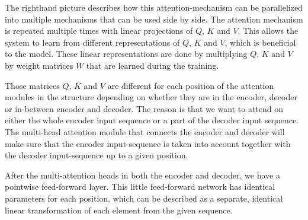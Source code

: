 The righthand picture describes how this attention-mechanism can be parallelized
into multiple mechanisms that can be used side by side. The attention mechanism
is repeated multiple times with linear projections of $Q$, $K$ and $V$. This
allows the system to learn from different representations of $Q$, $K$ and $V$,
which is beneficial to the model. These linear representations are done by multiplying
$Q$, $K$ and $V$ by weight matrices $W$ that are learned during the training.
\newline

Those matrices $Q$, $K$ and $V$ are different for each position of the attention
modules in the structure depending on whether they are in the encoder, decoder
or in-between encoder and decoder. The reason is that we want to attend on either
the whole encoder input sequence or a part of the decoder input sequence. The
multi-head attention module that connects the encoder and decoder will make sure
that the encoder input-sequence is taken into account together with the decoder
input-sequence up to a given position.
\newline

After the multi-attention heads in both the encoder and decoder, we have a pointwise
feed-forward layer. This little feed-forward network has identical parameters
for each position, which can be described as a separate, identical linear
transformation of each element from the given sequence.

